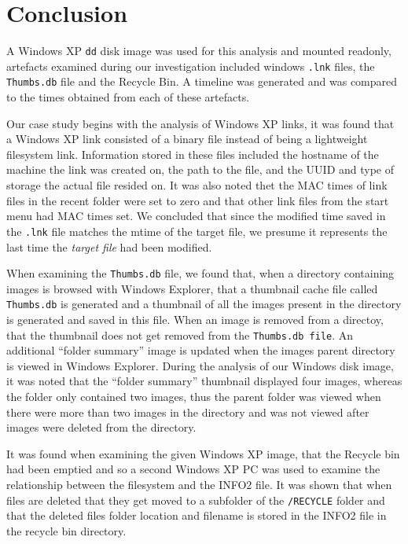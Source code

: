 \documentclass[a4paper,
    11pt,
    normalheadings,
    parindent,
    UKenglish,
    abstracton,
    ]{scrartcl}
\begin{document}
\section{Conclusion}


A Windows XP \texttt{dd} disk image was used for this analysis and mounted readonly, artefacts examined during our investigation included windows \texttt{.lnk} files, the \texttt{Thumbs.db} file and the Recycle Bin. A timeline was generated and was compared to the times obtained from each of these artefacts.

Our case study begins with the analysis of Windows XP links, it was found that a Windows XP link consisted of a binary file instead of being a lightweight filesystem link.
Information stored in these files included the hostname of the machine the link was created on, the path to the file, and the UUID and type of storage the actual file resided on.
It was also noted thet the MAC times of link files in the recent folder were set to zero and that other link files from the start menu had MAC times set.
We concluded that since the modified time saved in the \texttt{.lnk} file matches the mtime of the target file, we presume it represents the last time the \emph{target file} had been modified.

When examining the \texttt{Thumbs.db} file, we found that, when a directory containing images is browsed with Windows Explorer, that a thumbnail cache file called \texttt{Thumbs.db} is generated and a thumbnail of all the images present in the directory is generated and saved in this file.
When an image is removed from a directoy, that the thumbnail does not get removed from the \texttt{Thumbs.db file}.
An additional ``folder summary'' image is updated when the images parent directory is viewed in Windows Explorer.
During the analysis of our Windows disk image, it was noted that the ``folder summary'' thumbnail displayed four images, whereas the folder only contained two images, thus the parent folder was viewed when there were more than two images in the directory and was not viewed after images were deleted from the directory.

It was found when examining the given Windows XP image, that the Recycle bin had been emptied and so a second Windows XP PC was used to examine the relationship between the filesystem and the INFO2 file.
It was shown that when files are deleted that they get moved to a subfolder of the \texttt{/RECYCLE} folder and that the deleted files folder location and filename is stored in the INFO2 file in the recycle bin directory.
\end{document}
